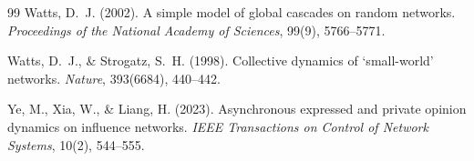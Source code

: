 \documentclass[11pt, a4paper]{article}
\begin{document}
\begin{thebibliography}{99}
Watts, D.~J. (2002).
A simple model of global cascades on random networks.
\textit{Proceedings of the National Academy of Sciences}, 99(9), 5766--5771.

Watts, D.~J., \& Strogatz, S.~H. (1998).
Collective dynamics of `small-world' networks.
\textit{Nature}, 393(6684), 440--442.

Ye, M., Xia, W., \& Liang, H. (2023).
Asynchronous expressed and private opinion dynamics on influence networks.
\textit{IEEE Transactions on Control of Network Systems}, 10(2), 544--555.

\end{thebibliography}
\end{document}
